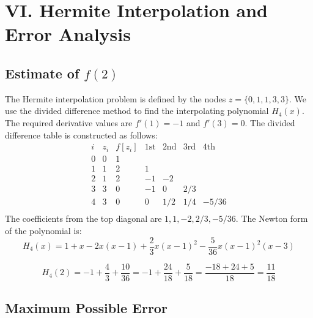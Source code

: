 \documentclass[a4paper]{article}
\begin{document}
\section*{VI. Hermite Interpolation and Error Analysis}

\subsection*{Estimate of $f(2)$}

The Hermite interpolation problem is defined by the nodes $z = \{0, 1, 1, 3, 3\}$. We use the divided difference method to find the interpolating polynomial $H_4(x)$.
The required derivative values are $f'(1)=-1$ and $f'(3)=0$. The divided difference table is constructed as follows:
\[
\begin{array}{c|c|ccccc}
i & z_i & f[z_i] & \text{1st} & \text{2nd} & \text{3rd} & \text{4th} \\
\hline
0 & 0 & 1 & & & & \\
1 & 1 & 2 & 1 & & & \\
2 & 1 & 2 & -1 & -2 & & \\
3 & 3 & 0 & -1 & 0 & 2/3 & \\
4 & 3 & 0 & 0 & 1/2 & 1/4 & -5/36 \\
\end{array}
\]
The coefficients from the top diagonal are $1, 1, -2, 2/3, -5/36$. The Newton form of the polynomial is:
\[
H_4(x) = 1 + x - 2x(x-1) + \frac{2}{3}x(x-1)^2 - \frac{5}{36}x(x-1)^2(x-3)
\]

\[
H_4(2) =  -1 + \frac{4}{3} + \frac{10}{36} = -1 + \frac{24}{18} + \frac{5}{18} = \frac{-18+24+5}{18} = \frac{11}{18}
\]

\subsection*{Maximum Possible Error}
\end{document}
